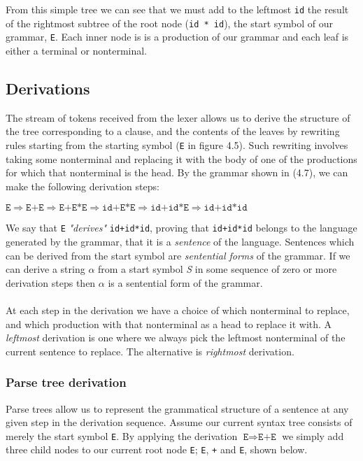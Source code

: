 \documentclass[a4paper, 11pt]{article}
\begin{document}
From this simple tree we can see that we must add to the leftmost \texttt{id} the result of the rightmost subtree of the root node (\texttt{id * id}), the start symbol of our grammar, \texttt{E}. Each inner node is is a production of our grammar and each leaf is either a terminal or nonterminal.

\subsection{Derivations}
The stream of tokens received from the lexer allows us to derive the structure of the tree corresponding to a clause, and the contents of the leaves by rewriting rules starting from the starting symbol (\texttt{E} in figure 4.5). Such rewriting involves taking some nonterminal and replacing it with the body of one of the productions for which that nonterminal is the head. By the grammar shown in (4.7), we can make the following derivation steps: 
\begin{center}
$\texttt{E} \Rightarrow \texttt{E+E} \Rightarrow \texttt{E+E*E} \Rightarrow \texttt{id+E*E} \Rightarrow \texttt{id+id*E} \Rightarrow \texttt{id+id*id}$
\end{center}
We say that \texttt{E} \textit{"derives"} \texttt{id+id*id}, proving that \texttt{id+id*id} belongs to the language generated by the grammar, that it is a \textit{sentence} of the language. Sentences which can be derived from the start symbol are \textit{sentential forms} of the grammar. If we can derive a string $\alpha$ from a start symbol \textit{S} in some sequence of zero or more derivation steps then $\alpha$ is a sentential form of the grammar.
\\\\
At each step in the derivation we have a choice of which nonterminal to replace, and which production with that nonterminal as a head to replace it with. A \textit{leftmost} derivation is one where we always pick the leftmost nonterminal of the current sentence to replace. The alternative is \textit{rightmost} derivation.

\subsubsection{Parse tree derivation}
Parse trees allow us to represent the grammatical structure of a sentence at any given step in the derivation sequence. Assume our current syntax tree consists of merely the start symbol \texttt{E}. By applying the derivation $\texttt{E} \Rightarrow \texttt{E+E}$ we simply add three child nodes to our current root node \texttt{E}; \texttt{E}, \texttt{+} and \texttt{E}, shown below.
\end{document}
